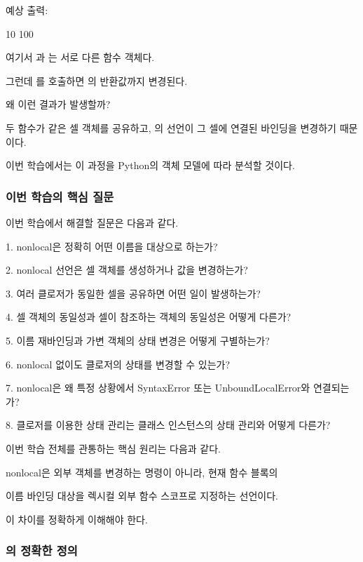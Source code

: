 예상 출력:

\begin{dhkzsh}
10
100
\end{dhkzsh}

여기서 과 는 서로 다른 함수 객체다.

그런데 를 호출하면 의 반환값까지 변경된다.

왜 이런 결과가 발생할까?

두 함수가 같은 셀 객체를 공유하고, 의  선언이 그 셀에 연결된 바인딩을 변경하기 때문이다.

이번 학습에서는 이 과정을 Python의 객체 모델에 따라 분석할 것이다.

\subsubsection{이번 학습의 핵심 질문}

이번 학습에서 해결할 질문은 다음과 같다.

\begin{dhksmry}
1. nonlocal은 정확히 어떤 이름을 대상으로 하는가?

2. nonlocal 선언은 셀 객체를 생성하거나 값을 변경하는가?

3. 여러 클로저가 동일한 셀을 공유하면 어떤 일이 발생하는가?

4. 셀 객체의 동일성과 셀이 참조하는 객체의 동일성은 어떻게 다른가?

5. 이름 재바인딩과 가변 객체의 상태 변경은 어떻게 구별하는가?

6. nonlocal 없이도 클로저의 상태를 변경할 수 있는가?

7. nonlocal은 왜 특정 상황에서 SyntaxError 또는
   UnboundLocalError와 연결되는가?

8. 클로저를 이용한 상태 관리는 클래스 인스턴스의 상태 관리와 어떻게 다른가?
\end{dhksmry}

이번 학습 전체를 관통하는 핵심 원리는 다음과 같다.

\begin{dhksmry}[centered]
nonlocal은 외부 객체를 변경하는 명령이 아니라, 현재 함수 블록의 

이름 바인딩 대상을 렉시컬 외부 함수 스코프로 지정하는 선언이다.
\end{dhksmry}

이 차이를 정확하게 이해해야 한다.

\subsubsection{의 정확한 정의}

